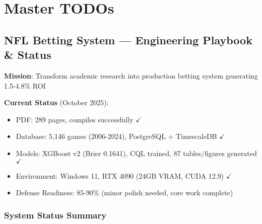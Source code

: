 \chapter*{Master TODOs}

\newcommand{\block}[1]{\par\noindent\textbf{#1}\par\vspace{0.25em}}
\newcommand{\milestone}[1]{\vspace{0.5em}\noindent\textbf{\large #1}\par\vspace{0.25em}\hrule\vspace{0.5em}}
\newcommand{\done}{\textcolor{green!60!black}{\(\checkmark\)}}
\newcommand{\wip}{\textcolor{orange!80!black}{(WIP)}}
\newcommand{\prio}[1]{\textcolor{blue!70!black}{[#1]}}
\newcommand{\blocked}{\textcolor{red!80!black}{[BLOCKED]}}

\begingroup
\RaggedRight\sloppy{}

\section*{NFL Betting System — Engineering Playbook \& Status}

\textbf{Mission}: Transform academic research into production betting system generating 1.5-4.8\% ROI

\textbf{Current Status} (October 2025):
\begin{itemize}
  \item PDF: 289 pages, compiles successfully \done
  \item Database: 5,146 games (2006-2024), PostgreSQL + TimescaleDB \done
  \item Models: XGBoost v2 (Brier 0.1641), CQL trained, 87 tables/figures generated \done
  \item Environment: Windows 11, RTX 4090 (24GB VRAM, CUDA 12.9) \done
  \item Defense Readiness: 85-90\% (minor polish needed, core work complete)
\end{itemize}

\subsection*{System Status Summary}

